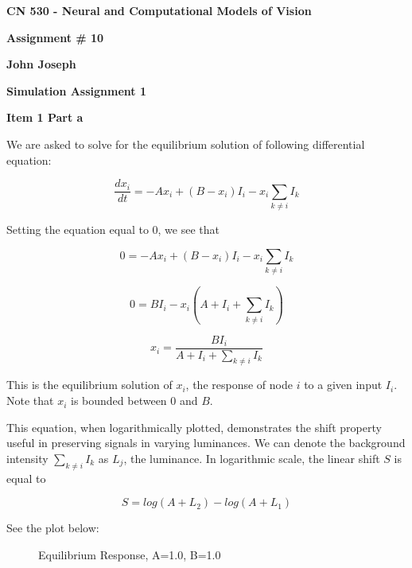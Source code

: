 \documentclass[a4paper,12pt]{article}
\begin{document}
\begin{center}

{\Large\bf CN 530 - Neural and Computational Models of Vision}

\bigskip

{\large\bf Assignment \# 10}
\smallskip

{\large\bf John Joseph}
\end{center}

\bigskip
{\bf Simulation Assignment 1}
\bigskip

{\bf Item 1 Part a}
\bigskip

We are asked to solve for the equilibrium solution of following differential equation:

\begin{equation}
\frac{dx_i}{dt} = -Ax_i+(B-x_i)I_i-x_i \sum_{k \neq i}I_k
\end{equation}

Setting the equation equal to 0, we see that

\begin{equation}
0 = -Ax_i+(B-x_i)I_i-x_i \sum_{k \neq i}I_k
\end{equation}

\begin{equation}
0 = BI_i-x_i(A+I_i+\sum_{k \neq i}I_k)
\end{equation}

\begin{equation}
x_i = \frac{BI_i}{A+I_i+\sum_{k\neq i}I_k}
\end{equation}

This is the equilibrium solution of $x_i$, the response of node $i$ to a given input $I_i$. Note that $x_i$ is bounded between 0 and $B$. 

\vspace{2mm}

This equation, when logarithmically plotted, demonstrates the shift property useful in preserving signals in varying luminances. We can denote the background intensity $\sum_{k\neq i}I_k$ as $L_j$, the luminance. In logarithmic scale, the linear shift $S$ is equal to 

\begin{equation}
S=log(A+L_2)-log(A+L_1)
\end{equation}

See the plot below:

\vfil\eject

\begin{center}
  \begin{figure}[h!]
    \caption{\label{pict1}Equilibrium Response, A=1.0, B=1.0}
  \end{figure}
\end{center}
\end{document}

